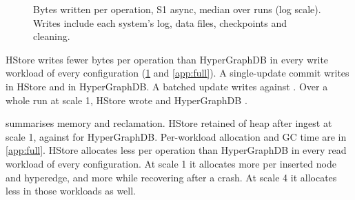 \begin{figure}[t]
\centering

\caption{Bytes written per operation, S1 async, median over runs (log scale). Writes include each system's log, data files, checkpoints and cleaning.}
\label{fig:writes}
\end{figure}

\begin{table}[t]
\centering\footnotesize
\caption{Resources per configuration, median over runs. HS: HStore, HG: HyperGraphDB. Space reclaimed is the drop in disk size across the compaction window; it is negative when the writer added more than the reclamation freed.}
\label{tab:memory}

\end{table}

HStore writes fewer bytes per operation than HyperGraphDB in every write workload of every configuration (\cref{fig:writes} and \cref{app:full}). A single-update commit writes  in HStore and  in HyperGraphDB. A batched update writes  against . Over a whole run at scale 1, HStore wrote  and HyperGraphDB .

 summarises memory and reclamation. HStore retained  of heap after ingest at scale 1, against  for HyperGraphDB. Per-workload allocation and GC time are in \cref{app:full}. HStore allocates less per operation than HyperGraphDB in every read workload of every configuration. At scale 1 it allocates more per inserted node and hyperedge, and more while recovering after a crash. At scale 4 it allocates less in those workloads as well.


